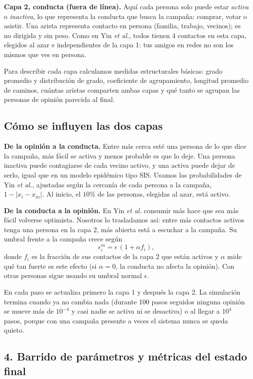 \documentclass[11pt]{article}
\begin{document}
\textbf{Capa 2, conducta (fuera de línea).} Aquí cada persona solo puede estar \emph{activa} o
\emph{inactiva}, lo que representa la conducta que busca la campaña: comprar, votar o asistir. Una
arista representa contacto en persona (familia, trabajo, vecinos); es no dirigida y sin peso. Como en
Yin \emph{et al.}, todos tienen 4 contactos en esta capa, elegidos al azar e independientes de la
capa 1: tus amigos en redes no son los mismos que ves en persona.

Para describir cada capa calculamos medidas estructurales básicas: grado promedio y distribución de
grado, coeficiente de agrupamiento, longitud promedio de caminos, cuántas aristas comparten ambas capas
y qué tanto se agrupan las personas de opinión parecida al final.

\subsection*{Cómo se influyen las dos capas}

\textbf{De la opinión a la conducta.} Entre más cerca esté una persona de lo que dice la campaña, más
fácil se activa y menos probable es que lo deje. Una persona inactiva puede contagiarse de cada
vecino activo, y una activa puede dejar de serlo, igual que en un modelo epidémico tipo SIS. Usamos
las probabilidades de Yin \emph{et al.}, ajustadas según la cercanía de cada persona a la campaña,
$1-|x_i-x_m|$. Al inicio, el $10\%$ de las personas, elegidas al azar, está activo.

\textbf{De la conducta a la opinión.} En Yin \emph{et al.} consumir más hace que sea más fácil volverse
optimista. Nosotros lo trasladamos así: entre más contactos activos tenga una persona en la capa 2,
más abierta está a escuchar a la campaña. Su umbral frente a la campaña crece según
\[
\epsilon_i^{m}=\epsilon\,(1+\alpha f_i),
\]
donde $f_i$ es la fracción de sus contactos de la capa 2 que están activos y $\alpha$ mide qué tan
fuerte es este efecto (si $\alpha=0$, la conducta no afecta la opinión). Con otras personas sigue
usando su umbral normal $\epsilon$.

En cada paso se actualiza primero la capa 1 y después la capa 2. La simulación termina cuando ya no
cambia nada (durante 100 pasos seguidos ninguna opinión se mueve más de $10^{-4}$ y casi nadie se
activa ni se desactiva) o al llegar a $10^4$ pasos, porque con una campaña presente a veces el sistema
nunca se queda quieto.

\subsection*{4. Barrido de parámetros y métricas del estado final}
\end{document}
